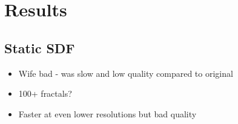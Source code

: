 \chapter{Results}
\label{chapter4}

\section{Static SDF}

\begin{itemize}
	\item Wife bad - was slow and low quality compared to original
	\item 100+ fractals?
	\item Faster at even lower resolutions but bad quality
\end{itemize}